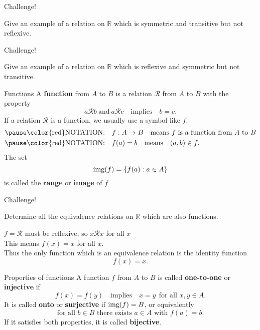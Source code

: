 \documentclass{beamer}
\begin{document}
\begin{frame}{Challenge!}
\begin{prob}
Give an example of a relation on $\mathbb{R}$ which is symmetric and transitive but not reflexive.
\end{prob}
\end{frame}

\begin{frame}{Challenge!}
\begin{prob}
Give an example of a relation on $\mathbb{R}$ which is reflexive and symmetric but not transitive.
\end{prob}
\end{frame}

\begin{frame}{Functions}
A \textbf{function} from $A$ to $B$ is a relation $\mathcal R$ from $A$ to $B$ with the property
\pause
$$a\mathcal Rb\ \text{and}\ a\mathcal Rc\quad\text{implies}\quad b=c.$$
\pause
If a relation $\mathcal R$ is a function, we usually use a symbol like $f$.\\
\begin{align*}
\pause
\text{\color{red}NOTATION:}&\quad f: A\rightarrow B\quad\text{means $f$ is a function from $A$ to $B$}\\
\pause
\text{\color{red}NOTATION:}&\quad f(a) = b\quad\text{means}\quad (a,b)\in f.
\end{align*}
\pause
The set $$\textnormal{img}(f) = \{f(a): a\in A\}$$ is called the \textbf{range} or \textbf{image} of $f$
\end{frame}

\begin{frame}{Challenge!}
\begin{prob}
Determine all the equivalence relations on $\mathbb{R}$ which are also functions.
\end{prob}
\pause
\begin{soln}
$f=\mathcal R$ must be reflexive, so $x\mathcal Rx$ for all $x$\\
\pause
This means $f(x) = x$ for all $x$.\\
\pause
Thus the only function which is an equivalence relation is the identity function
$$f(x) = x.$$
\end{soln}
\end{frame}

\begin{frame}{Properties of functions}
A function $f$ from $A$ to $B$ is called \textbf{one-to-one} or \textbf{injective} if 
\pause
$$f(x) = f(y) \quad\text{implies}\quad x=y\ \ \text{for all $x,y\in A$}.$$
\pause
It is called \textbf{onto} or \textbf{surjective} if $\textnormal{img}(f) = B$, or equivalently
$$\text{for all $b\in B$ there exists $a\in A$ with $f(a) =b$}.$$
\pause
If it satisfies both properties, it is called \textbf{bijective}.
\end{frame}
\end{document}
